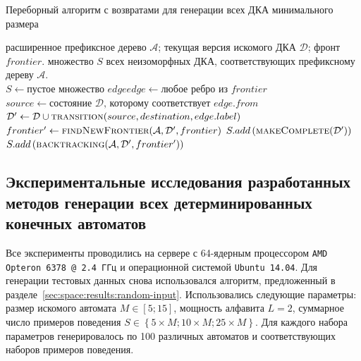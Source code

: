 \begin{algorithm}[ht]
  \caption{Переборный алгоритм с возвратами для генерации всех ДКА минимального размера}
  \label{algo:backtracking}
  \begin{algorithmic}[0]
    \Require расширенное префиксное дерево $\mathcal{A}$; %
    текущая версия искомого ДКА $\mathcal{D}$; %
    фронт $frontier$.
    \Ensure множество $S$ всех неизоморфных ДКА, соответствующих префиксному дереву $\mathcal{A}$.
    \\\hrulefill
      \State $S \gets \text{пустое множество}$
      \State $edge edge \gets \text{любое ребро из } frontier$
        \State $source \gets \text{состояние }\mathcal{D}\text{, которому соответствует } edge.from$
        \State $\mathcal{D'} \gets \mathcal{D} \cup \Call{transition}{source, destination, edge.label}$
        \State $frontier' \gets \Call{findNewFrontier}{\mathcal{A}, \mathcal{D'}, frontier}$
            \State $S.add\left(\Call{makeComplete}{\mathcal{D'}}\right)$
          \Else
            \State $S.add\left(\Call{backtracking}{\mathcal{A}, \mathcal{D'}, frontier'}\right)$
          \EndIf
        \EndIf
      \EndFor
    \EndFunction
  \end{algorithmic}
\end{algorithm}


\subsection{Экспериментальные исследования разработанных методов генерации всех детерминированных конечных автоматов}
\label{sec:findall:results:dfs}

Все эксперименты проводились на сервере с 64-ядерным процессором \texttt{AMD Opteron 6378 @ 2.4 ГГц} и операционной системой \texttt{Ubuntu 14.04}.
Для генерации тестовых данных снова использовался алгоритм, предложенный в разделе~\ref{sec:space:results:random-input}.
Использовались следующие параметры: размер искомого автомата $M \in \left[5; 15\right]$, мощность алфавита $L = 2$, суммарное число примеров поведения $S \in \left\{5 \times M; 10 \times M; 25 \times M\right\}$.
Для каждого набора параметров генерировалось по 100 различных автоматов и соответствующих наборов примеров поведения.

